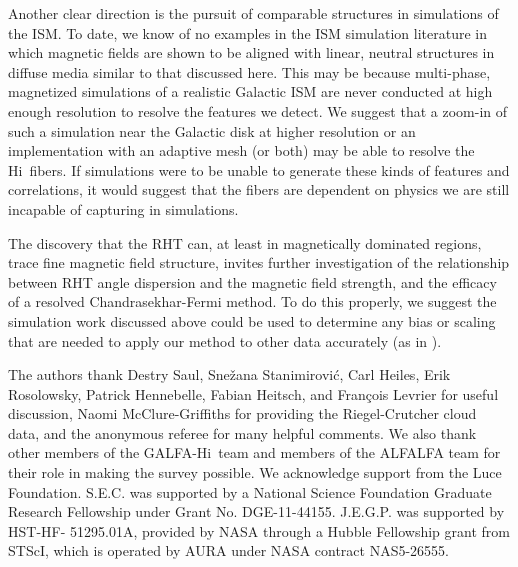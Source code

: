 \documentclass[12pt]{emulateapj}
\newcommand{\hi}{H{\sc i}~}
\newcommand{\citei}[1]{\citeauthor{#1} \citeyear{#1}}
\begin{document}
Another clear direction is the pursuit of comparable structures in simulations of the ISM. To date, we know of no examples in the ISM simulation literature in which magnetic fields are shown to be aligned with linear, neutral structures in diffuse media similar to that discussed here. This may be because multi-phase, magnetized simulations of a realistic Galactic ISM \citep[e.~g.~][]{2012arXiv1202.0552H} are never conducted at high enough resolution to resolve the features we detect. We suggest that a zoom-in of such a simulation near the Galactic disk at higher resolution or an implementation with an adaptive mesh (or both) may be able to resolve the \hi fibers. If simulations were to be unable to generate these kinds of features and correlations, it would suggest that the fibers are dependent on physics we are still incapable of capturing in simulations.

The discovery that the RHT can, at least in magnetically dominated regions, trace fine magnetic field structure, invites further investigation of the relationship between RHT angle dispersion and the magnetic field strength, and the efficacy of a resolved Chandrasekhar-Fermi method. To do this properly, we suggest the simulation work discussed above could be used to determine any bias or scaling that are needed to apply our method to other data accurately (as in \citei{Heitsch:2001da}).


\acknowledgements

The authors thank Destry Saul, Sne\v zana Stanimirovi\' c, Carl Heiles, Erik Rosolowsky, Patrick Hennebelle, Fabian Heitsch, and Fran\c cois Levrier for useful discussion, Naomi McClure-Griffiths for providing the Riegel-Crutcher cloud data, and the anonymous referee for many helpful comments. We also thank other members of the GALFA-\hi team and members of the ALFALFA team for their role in making the survey possible.
We acknowledge support from the Luce Foundation. S.E.C. was supported by a National Science Foundation Graduate Research Fellowship under Grant No. DGE-11-44155. J.E.G.P. was supported by HST-HF- 51295.01A, provided by NASA through a Hubble Fellowship grant from STScI, which is operated by AURA under NASA contract NAS5-26555.


\end{document}
